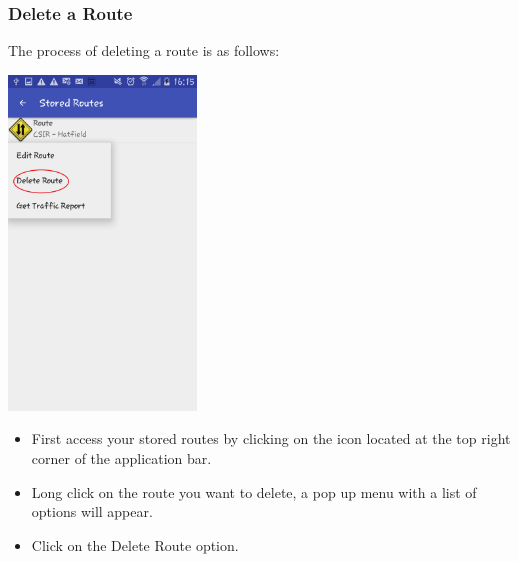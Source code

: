\documentclass[a4paper,12pt]{article}
\begin{document}
\subsubsection{Delete a Route}
The process of deleting a route is as follows:
\begin{center}
\includegraphics[width=50mm, scale=0.5]{images/DeleteOption.png}
\end{center}
\begin{itemize}
    \item First access your stored routes by  clicking on the icon located at the top right corner of the application bar. 
    \item Long click on the route you want to delete, a pop up menu with a list of options will appear.
    \item Click on the Delete Route option.
\end{itemize}
\end{document}
